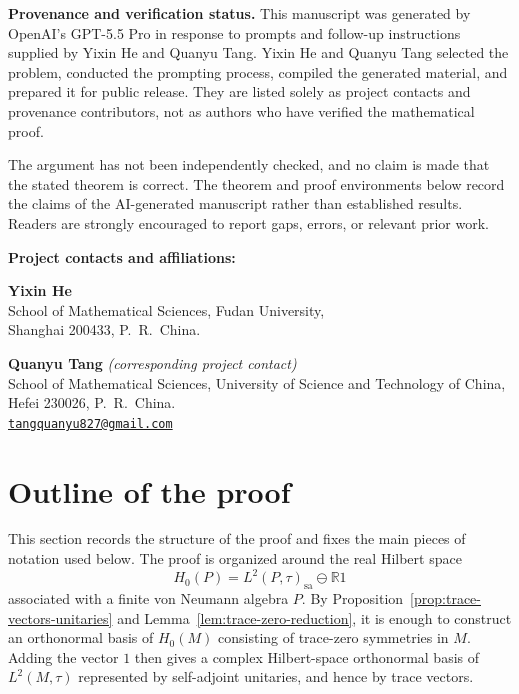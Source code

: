 \documentclass[11pt,letterpaper,reqno]{amsart}
\theoremstyle{definition}
\numberwithin{equation}{section}
\newcommand{\sa}{\mathrm{sa}}
\newcommand{\RR}{\mathbb R}
\newcommand{\one}{1}
\begin{document}
\begin{center} 
\begin{minipage}{0.92\textwidth} 
\small 
\textbf{Provenance and verification status.} This manuscript was generated by OpenAI's GPT-5.5 Pro in response to prompts and follow-up instructions supplied by Yixin He and Quanyu Tang. Yixin He and Quanyu Tang selected the problem, conducted the prompting process, compiled the generated material, and prepared it for public release. They are listed solely as project contacts and provenance contributors, not as authors who have verified the mathematical proof.


The argument has not been independently checked, and no claim is made that the stated theorem is correct. The theorem and proof environments below record the claims of the AI-generated manuscript rather than established results. Readers are strongly encouraged to report gaps, errors, or relevant prior work.



\medskip
\noindent
\textbf{Project contacts and affiliations:}

\medskip
\noindent
\textbf{Yixin He}\\
School of Mathematical Sciences, Fudan University,\\
Shanghai 200433, P.~R.~China.

\medskip
\noindent
\textbf{Quanyu Tang} \textit{(corresponding project contact)}\\
School of Mathematical Sciences, University of Science and Technology of China,\\
Hefei 230026, P.~R.~China.\\
\href{mailto:tangquanyu827@gmail.com}
{\nolinkurl{tangquanyu827@gmail.com}}
\end{minipage}
\end{center}





\bigskip





\section{Outline of the proof}\label{sec:outline}

This section records the structure of the proof and fixes the main pieces of
notation used below. The proof is organized around the real Hilbert
space
\[
   H_0(P)=L^2(P,\tau)_{\sa}\ominus \RR\one
\]
associated with a finite von Neumann algebra $P$.  By
Proposition~\ref{prop:trace-vectors-unitaries} and
Lemma~\ref{lem:trace-zero-reduction}, it is enough to construct an
orthonormal basis of $H_0(M)$ consisting of trace-zero symmetries in $M$.
Adding the vector $\one$ then gives a complex Hilbert-space orthonormal basis
of $L^2(M,\tau)$ represented by self-adjoint unitaries, and hence by trace
vectors.
\end{document}
